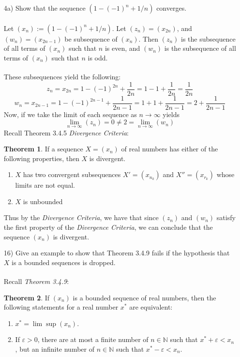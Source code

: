 \documentclass[12pt,letterpaper]{article}
\newcommand{\N}{\mathbb{N}}
\theoremstyle{case}
\theoremstyle{definition}
\newtheorem*{theorem*}{Theorem}
\begin{document}
\begin{enumerate}
\begin{enumerate}
		\item[4a)] Show that the sequence $(1-(-1)^n+1/n)$ converges.
		\\\\ Let $(x_n):=(1-(-1)^n+1/n)$. Let $(z_n)=(x_{2n})$, and $(w_n)=(x_{2n-1})$ be subsequence of $(x_n)$. Then $(z_n)$ is the subsequence of all terms of $(x_n)$ such that $n$ is even, and $(w_n)$ is the subsequence of all terms of $(x_n)$ such that $n$ is odd.
		\\\\These subsequences yield the following:
		\[z_n = x_{2n} = 1-(-1)^{2n}+\frac{1}{2n}=1-1+\frac{1}{2n}=\frac{1}{2n}\]
		\[w_n=x_{2n-1}=1-(-1)^{2n-1}+\frac{1}{2n-1}=1+1+\frac{1}{2n-1}=2+\frac{1}{2n-1}\]
		Now, if we take the limit of each sequence as $n \rightarrow \infty$ yields
		\[\lim_{n \to \infty} (z_n) = 0 \neq 2 = \lim_{n \to \infty} (w_n)\]
		Recall Theorem 3.4.5 \textit{Divergence Criteria}:
		\begin{theorem*}
			If a sequence $X=(x_n)$ of real numbers has either of the following properties, then $X$ is divergent.
			\begin{enumerate}
				\item $X$ has two convergent subsequences $X'=(x_{n_k})$ and $X''=(x_{r_k})$ whose limits are not equal.
				
				\item $X$ is unbounded
			\end{enumerate}
		\end{theorem*}
		Thus by the \textit{Divergence Criteria}, we have that since $(z_n)$ and $(w_n)$ satisfy the first property of the \textit{Divergence Criteria}, we can conclude that the sequence $(x_n)$ is divergent. \\
		
		\item[16)] Give an example to show that Theorem 3.4.9 fails if the hypothesis that $X$ is a bounded sequences is dropped.
		\\\\Recall \textit{Theorem 3.4.9}:
		\begin{theorem*}
			If $(x_n)$ is a bounded sequence of real numbers, then the following statements for a real number $x^*$ are equivalent:
			\begin{enumerate}
				\item $x^*= \lim \sup (x_n)$.
				
				\item If $\varepsilon > 0$, there are at most a finite number of $n \in \N$ such that $x^*+\varepsilon<x_n$, but an infinite number of $n \in \N$ such that $x^*-\varepsilon<x_n$.
				

\end{enumerate}
\end{theorem*}
\end{enumerate}
\end{enumerate}
\end{document}
